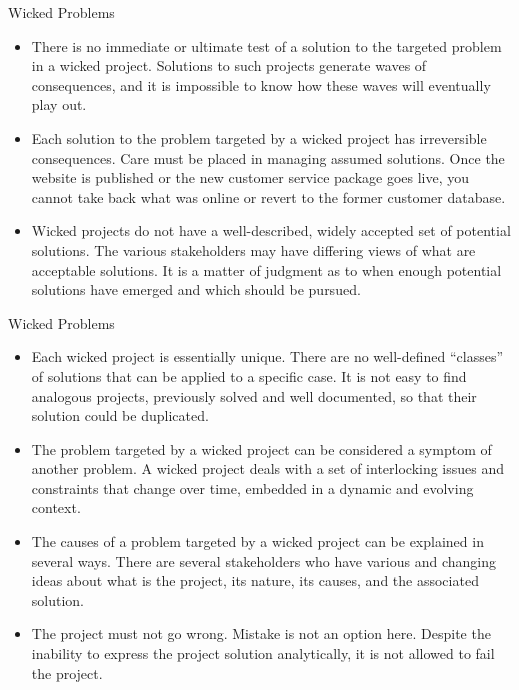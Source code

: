 \documentclass{beamer}
\begin{document}

\begin{frame}{\centerline{Wicked Problems}}
\small
\begin{itemize}
\item There is no immediate or ultimate test of a solution to the targeted problem in a wicked project. Solutions to such projects generate waves of consequences, and it is impossible to know how these waves will eventually play out.

\item Each solution to the problem targeted by a wicked project has irreversible consequences. Care must be placed in managing assumed solutions. Once the website is published or the new customer service package goes live, you cannot take back what was online or revert to the former customer database.

\item Wicked projects do not have a well-described, widely accepted set of potential solutions. The various stakeholders may have differing views of what are acceptable solutions. It is a matter of judgment as to when enough potential solutions have emerged and which should be pursued.

\end{itemize}

\end{frame}
\begin{frame}{\centerline{Wicked Problems}}
\small
\begin{itemize}
\item Each wicked project is essentially unique. There are no well-defined ``classes'' of solutions that can be applied to a specific case. It is not easy to find analogous projects, previously solved and well documented, so that their solution could be duplicated.

\item The problem targeted by a wicked project can be considered a symptom of another problem. A wicked project deals with a set of interlocking issues and constraints that change over time, embedded in a dynamic and evolving context.

\item The causes of a problem targeted by a wicked project can be explained in several ways. There are several stakeholders who have various and changing ideas about what is the project, its nature, its causes, and the associated solution.

\item The project must not go wrong. Mistake is not an option here. Despite the inability to express the project solution analytically, it is not allowed to fail the project.
\end{itemize}

\end{frame}
\end{document}
